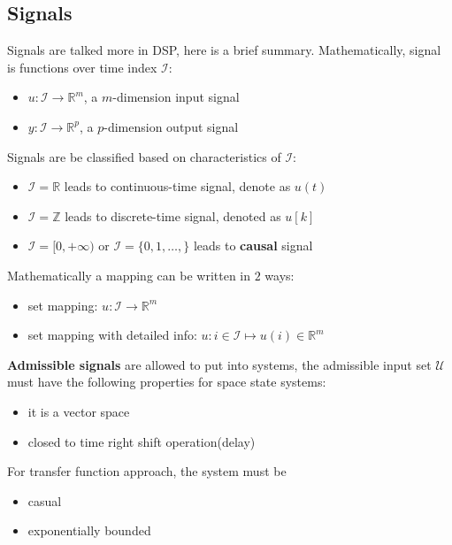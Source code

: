 \documentclass[10pt,a4paper,oneside]{article}
\begin{document}
\subsection{Signals}
Signals are talked more in DSP, here is a brief summary. Mathematically, signal is functions over time index $\mathcal{I}$:
\begin{itemize}
	\item $u: \mathcal{I} \rightarrow \mathbb{R}^m$, a $m$-dimension input signal
	\item $y: \mathcal{I} \rightarrow \mathbb{R}^p$, a $p$-dimension output signal
\end{itemize}
Signals are be classified based on characteristics of $\mathcal{I}$:
\begin{itemize}
	\item $\mathcal{I} = \mathbb{R}$ leads to continuous-time signal, denote as $u(t)$
	\item $\mathcal{I} = \mathbb{Z}$ leads to discrete-time signal, denoted as $u[k]$
	\item $\mathcal{I}=[0, +\infty)$ or $\mathcal{I}=\{0, 1, \dots,\}$ leads to \textbf{causal} signal
\end{itemize}
Mathematically a mapping can be written in $2$ ways:
\begin{itemize}
	\item set mapping: $u: \mathcal{I} \rightarrow \mathbb{R}^m$
	\item set mapping with detailed info: $u: i \in \mathcal{I} \mapsto u(i) \in \mathbb{R}^m$
\end{itemize}
\textbf{Admissible signals} are allowed to put into systems, the admissible input set $\mathcal{U}$ must have the following properties for space state systems:
\begin{itemize}
	\item it is a vector space
	\item closed to time right shift operation(delay)
\end{itemize}
For transfer function approach, the system must be
\begin{itemize}
	\item casual
	\item exponentially bounded
\end{itemize} 
\end{document}
